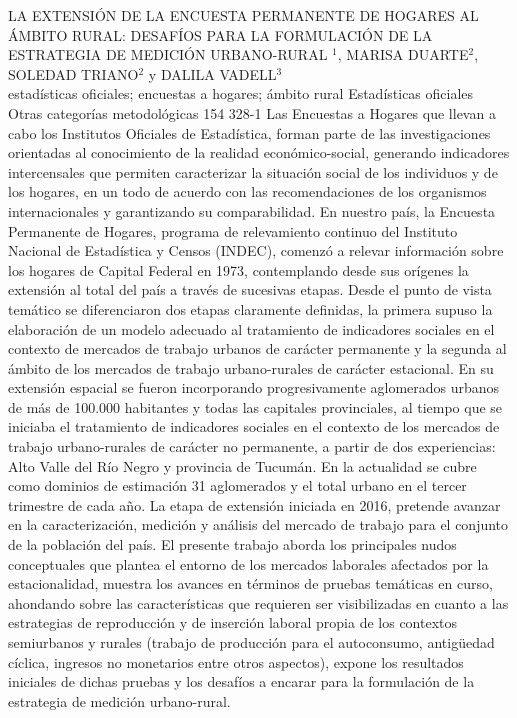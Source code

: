 \A
{LA EXTENSIÓN DE LA ENCUESTA PERMANENTE DE HOGARES AL ÁMBITO RURAL: DESAFÍOS PARA LA FORMULACIÓN DE LA ESTRATEGIA DE MEDICIÓN URBANO-RURAL}
{$^1$, MARISA DUARTE$^2$, SOLEDAD TRIANO$^2$ y DALILA VADELL$^3$}
{
\\}
{estadísticas oficiales; encuestas a hogares; ámbito rural} 
 {Estadísticas oficiales} 
 {Otras categorías metodológicas} 
 {154} 
 {328-1}
{Las Encuestas a Hogares que llevan a cabo los Institutos Oficiales de Estadística, forman parte de las investigaciones orientadas al conocimiento de la realidad económico-social, generando indicadores intercensales que permiten caracterizar la situación social de los individuos y de los hogares, en un todo de acuerdo con las recomendaciones de los organismos internacionales y garantizando su comparabilidad. En nuestro país, la Encuesta Permanente de Hogares, programa de relevamiento continuo del Instituto Nacional de Estadística y Censos (INDEC), comenzó a relevar información sobre los hogares de Capital Federal en 1973, contemplando desde sus orígenes la extensión al total del país a través de sucesivas etapas. Desde el punto de vista temático se diferenciaron dos etapas claramente definidas, la primera supuso la elaboración de un modelo adecuado al tratamiento de indicadores sociales en el contexto de mercados de trabajo urbanos de carácter permanente y la segunda al ámbito de los mercados de trabajo urbano-rurales de carácter estacional. En su extensión espacial se fueron incorporando progresivamente aglomerados urbanos de más de 100.000 habitantes y todas las capitales provinciales, al tiempo que se iniciaba el tratamiento de indicadores sociales en el contexto de los mercados de trabajo urbano-rurales de carácter no permanente, a partir de dos experiencias: Alto Valle del Río Negro y provincia de Tucumán. En la actualidad se cubre como dominios de estimación 31 aglomerados y el total urbano en el tercer trimestre de cada año. La etapa de extensión iniciada en 2016, pretende avanzar en la caracterización, medición y análisis del mercado de trabajo para el conjunto de la población del país. El presente trabajo aborda los principales nudos conceptuales que plantea el entorno de los mercados laborales afectados por la estacionalidad, muestra los avances en términos de pruebas temáticas en curso, ahondando sobre las características que requieren ser visibilizadas en cuanto a las estrategias de reproducción y de inserción laboral propia de los contextos semiurbanos y rurales (trabajo de producción para el autoconsumo, antigüedad cíclica, ingresos no monetarios entre otros aspectos), expone los resultados iniciales de dichas pruebas y los desafíos a encarar para la formulación de la estrategia de medición urbano-rural. }
